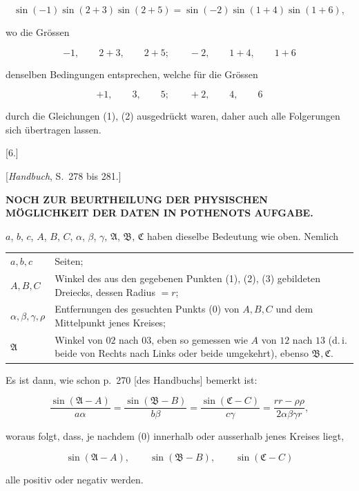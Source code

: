 
\[
\sin(-1)\sin(2+3)\sin(2+5) = \sin(-2)\sin(1+4)\sin(1+6),
\]

wo die Grössen

\[
-1, \qquad 2+3, \qquad 2+5; \qquad -2, \qquad 1+4, \qquad 1+6
\]

denselben Bedingungen entsprechen, welche für die Grössen

\[
+1, \qquad 3, \qquad 5; \qquad +2, \qquad 4, \qquad 6
\]

durch die Gleichungen (1), (2) ausgedrückt waren, daher auch alle Folgerungen sich übertragen lassen.

\begin{center}
[6.]

[\emph{Handbuch}, S.\ 278 bis 281.]

\textbf{NOCH ZUR BEURTHEILUNG DER PHYSISCHEN MÖGLICHKEIT DER DATEN IN POTHENOTS AUFGABE.}
\end{center}

$a$, $b$, $c$, $A$, $B$, $C$, $\alpha$, $\beta$, $\gamma$, $\mathfrak{A}$, $\mathfrak{B}$, $\mathfrak{C}$ haben dieselbe Bedeutung wie oben. Nemlich

\begin{center}\begin{tabular}{@{}lp{9.8cm}@{}}
$a,b,c$ & Seiten;\\
$A,B,C$ & Winkel des aus den gegebenen Punkten (1), (2), (3) gebildeten Dreiecks, dessen Radius $=r$;\\
$\alpha,\beta,\gamma,\rho$ & Entfernungen des gesuchten Punkts (0) von $A,B,C$ und dem Mittelpunkt jenes Kreises;\\
$\mathfrak{A}$ & Winkel von $02$ nach $03$, eben so gemessen wie $A$ von $12$ nach $13$ (d.\,i. beide von Rechts nach Links oder beide umgekehrt), ebenso $\mathfrak{B},\mathfrak{C}$.
\end{tabular}\end{center}

Es ist dann, wie schon p.\ 270 [des Handbuchs] bemerkt ist:

\[
\frac{\sin(\mathfrak{A}-A)}{a\alpha} = \frac{\sin(\mathfrak{B}-B)}{b\beta} = \frac{\sin(\mathfrak{C}-C)}{c\gamma} = \frac{rr-\rho\rho}{2\alpha\beta\gamma r},
\]

woraus folgt, dass, je nachdem (0) innerhalb oder ausserhalb jenes Kreises liegt,

\[
\sin(\mathfrak{A}-A), \qquad \sin(\mathfrak{B}-B), \qquad \sin(\mathfrak{C}-C)
\]

alle positiv oder negativ werden.
